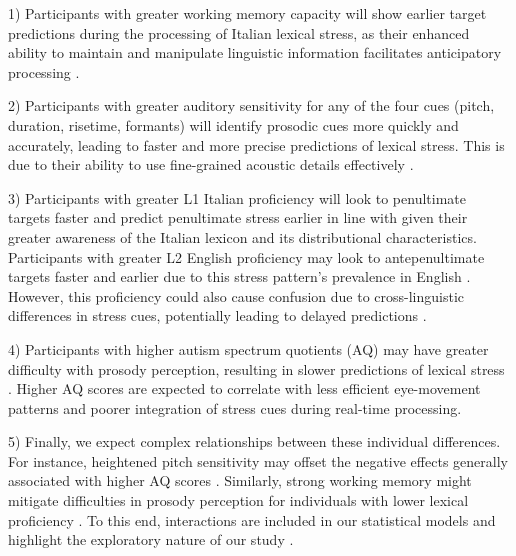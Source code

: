 1) Participants with greater working memory capacity will show earlier target predictions during the processing of Italian lexical stress, as their enhanced ability to maintain and manipulate linguistic information facilitates anticipatory processing \citep{Traxler2009, Huettig2016}.

2) Participants with greater auditory sensitivity for any of the four cues (pitch, duration, risetime, formants) will identify prosodic cues more quickly and accurately, leading to faster and more precise predictions of lexical stress. This is due to their ability to use fine-grained acoustic details effectively \citep{nan_2010, goss_2014,mcmurray_2008}.

3) Participants with greater L1 Italian proficiency will look to penultimate targets faster and predict penultimate stress earlier in line with \cite{Sulpizio_McQueen_2012} given their greater awareness of the Italian lexicon and its distributional characteristics. Participants with greater L2 English proficiency may look to antepenultimate targets faster and earlier due to this stress pattern's prevalence in English \citep{cutler2007dutch}. However, this proficiency could also cause confusion due to cross-linguistic differences in stress cues, potentially leading to delayed predictions \citep{primativo2013bilingual}. 

4) Participants with higher autism spectrum quotients (AQ) may have greater difficulty with prosody perception, resulting in slower predictions of lexical stress \citep{schelinski2020speech, grossman2023relationship}. Higher AQ scores are expected to correlate with less efficient eye-movement patterns and poorer integration of stress cues during real-time processing.

5) Finally, we expect complex relationships between these individual differences. For instance, heightened pitch sensitivity may offset the negative effects generally associated with higher AQ scores \citep{Liu2018}. Similarly, strong working memory might mitigate difficulties in prosody perception for individuals with lower lexical proficiency \citep{Huettig2016}. To this end, interactions are included in our statistical models and highlight the exploratory nature of our study \cite{Yanai2020}.